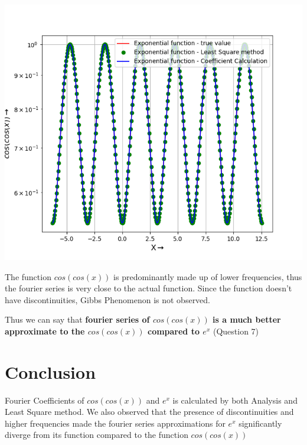 \documentclass[12pt, a4paper]{report}
\begin{document}
\begin{center}
	\includegraphics[scale=0.85]{Figure_12} 
	\caption{\\$cos(cos(x))$}
	\label{fig:rawdata}
\end{center}

The function $cos(cos(x))$ is predominantly made up of lower frequencies, thus the fourier series is very close to the actual function. Since the function doesn't have discontinuities, Gibbs Phenomenon is not observed.

Thus we can say that \textbf{fourier series of $cos(cos(x))$ is a much better approximate to the $cos(cos(x))$ compared to $e^x$} (Question 7)

\section*{Conclusion}
Fourier Coefficients of $cos(cos(x))$ and $e^x$ is calculated by both Analysis and Least Square method. We also observed that the presence of discontinuities and higher frequencies made the fourier series approximations for $e^x$ significantly diverge from its function compared to the function $cos(cos(x))$ 
\end{document}
